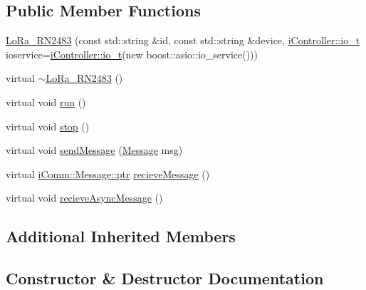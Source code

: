 \subsection*{Public Member Functions}
\begin{DoxyCompactItemize}
\item 
\hyperlink{classo_cpt_1_1components_1_1comm_1_1_lo_ra___r_n2483_a28a38609b53766c8f316fcbd3abae5f8}{Lo\+Ra\+\_\+\+R\+N2483} (const std\+::string \&id, const std\+::string \&device, \hyperlink{classo_cpt_1_1i_controller_a51c3436b03060209f6cd2ddce6df2d0c}{i\+Controller\+::io\+\_\+t} ioservice=\hyperlink{classo_cpt_1_1i_controller_a51c3436b03060209f6cd2ddce6df2d0c}{i\+Controller\+::io\+\_\+t}(new boost\+::asio\+::io\+\_\+service()))
\item 
virtual \hyperlink{classo_cpt_1_1components_1_1comm_1_1_lo_ra___r_n2483_a30d55c900718ac38d0207c6f678ca96c}{$\sim$\+Lo\+Ra\+\_\+\+R\+N2483} ()
\item 
virtual void \hyperlink{classo_cpt_1_1components_1_1comm_1_1_lo_ra___r_n2483_ae5d4406cecd941f4817e05787f79ca5d}{run} ()
\item 
virtual void \hyperlink{classo_cpt_1_1components_1_1comm_1_1_lo_ra___r_n2483_a3c8420219e7326727bbca88b0d92b69a}{stop} ()
\item 
virtual void \hyperlink{classo_cpt_1_1components_1_1comm_1_1_lo_ra___r_n2483_aa8cdf42e61ab19a04e0c24d4b8190c23}{send\+Message} (\hyperlink{structo_cpt_1_1i_comm_1_1_message}{Message} msg)
\item 
virtual \hyperlink{structo_cpt_1_1i_comm_1_1_message_ad2ba828ad76f96a30e3898b2609a4c01}{i\+Comm\+::\+Message\+::ptr} \hyperlink{classo_cpt_1_1components_1_1comm_1_1_lo_ra___r_n2483_aab494573c72b5b5b0b2d1d106844a043}{recieve\+Message} ()
\item 
virtual void \hyperlink{classo_cpt_1_1components_1_1comm_1_1_lo_ra___r_n2483_a52af3c5bd992fc6cbe3e88989a3a25fc}{recieve\+Async\+Message} ()
\end{DoxyCompactItemize}
\subsection*{Additional Inherited Members}


\subsection{Constructor \& Destructor Documentation}
